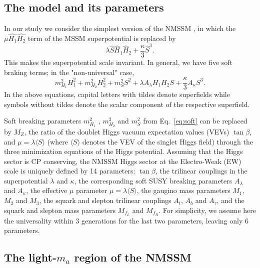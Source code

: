 \documentclass[aps,12pt,superscriptaddress,nofootinbib,floatfix,showpacs]{revtex4}
\begin{document}
\subsection{The model and its parameters}
In our study we consider the simplest version of the NMSSM
\cite{Nilles:1982dy,Frere:1983ag,Ellis:1988er,%
Drees:1988fc,Ellwanger:1993hn,Ellwanger:1993xa,%
Elliott:1993bs,Pandita:1993tg,Ellwanger:1995ru,%
King:1995vk,Franke:1995tc,Ellwanger:1996gw},
in which the $\mu\widehat{H_1}\widehat{H_2}$ term of the 
MSSM superpotential is replaced by
\begin{equation}
\lambda  \widehat{S} \widehat{H}_1 \widehat{H}_2 + \frac{\kappa}{3}  \widehat{S}^3 \mbox{.}
\label{eq:superpot} 
\end{equation}
This makes the superpotential scale invariant.  In general, we have five
soft braking terms; in the "non-universal" case,
\begin{equation}
  m_{H_1}^2 H_1^2 + m_{H_2}^2 H_2^2  + m_{S}^2 S^2 
+ \lambda A_\lambda H_1 H_2 S +  \frac{\kappa}{3} A_\kappa S^3.
\label{eq:soft} 
\end{equation}
In the above equations, capital letters with tildes denote superfields
while symbols without tildes denote the scalar component of the respective
superfield.

Soft breaking parameters
$m_{H_1}^2$ , $m_{H_2}^2$  and $m_{S}^2$ 
from Eq.~\ref{eq:soft} can  be replaced by
$M_Z$, the ratio  of the doublet Higgs vacuum expectation values (VEVs) $\tan\beta$,
and $\mu = \lambda \langle S \rangle$
(where $\langle S \rangle$ denotes the VEV of the singlet Higgs field)
through the three minimization equations of the Higgs potential.
Assuming that the Higgs sector is CP conserving,
the NMSSM Higgs sector at the Electro-Weak (EW) scale is uniquely defined
by 14 parameters:
$\tan\beta$,
the trilinear couplings in the superpotential $\lambda$ and $\kappa$, the
corresponding soft SUSY breaking parameters $A_\lambda$ and $A_\kappa$,
the effective $\mu$ parameter $\mu = \lambda \langle S \rangle$,
the gaugino mass parameters $M_1$, $M_2$ and $M_3$,
the squark and slepton trilinear couplings
$A_{t}$,  $A_{b}$ and  $A_\tau$,
and the squark and slepton mass parameters $M_{f_L}$ and $M_{f_R}$.
For simplicity, we assume here the
universality within 3 generations for the last two parameters, leaving
only 6 parameters.

\subsection{The light-$m_a$ region of the NMSSM}
\end{document}
